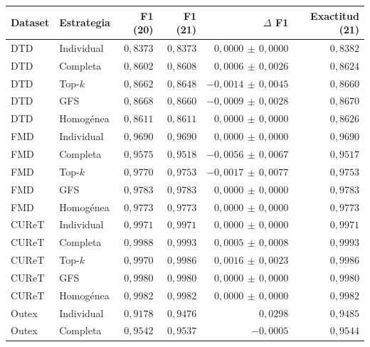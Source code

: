 \begin{resulttable}
\centering\fontsize{9}{11}\selectfont\setlength{\tabcolsep}{3.6pt}
\caption{Comparación completa con ResMLP: medias con 20 frente a 21 bloques, incluyendo RGB Pixel N-grams + SVD. Mismas 28 condiciones externas: DTD (10), FMD (15), CUReT (2) y Outex (1). La selección se repite dentro del entrenamiento.}
\label{tab:ngram-multibase}
\begin{tabular}{@{}llrrrr@{}}
\toprule
Dataset & Estrategia & F1 (20) & F1 (21) & $\Delta$ F1 & Exactitud (21) \\
\midrule
DTD & Individual & $0{,}8373$ & $0{,}8373$ & $0{,}0000\,\pm\,0{,}0000$ & $0{,}8382$ \\
DTD & Completa & $0{,}8602$ & $0{,}8608$ & $0{,}0006\,\pm\,0{,}0026$ & $0{,}8624$ \\
DTD & Top-$k$ & $0{,}8662$ & $0{,}8648$ & $-0{,}0014\,\pm\,0{,}0045$ & $0{,}8660$ \\
DTD & GFS & $0{,}8668$ & $0{,}8660$ & $-0{,}0009\,\pm\,0{,}0028$ & $0{,}8670$ \\
DTD & Homogénea & $0{,}8611$ & $0{,}8611$ & $0{,}0000\,\pm\,0{,}0000$ & $0{,}8626$ \\
FMD & Individual & $0{,}9690$ & $0{,}9690$ & $0{,}0000\,\pm\,0{,}0000$ & $0{,}9690$ \\
FMD & Completa & $0{,}9575$ & $0{,}9518$ & $-0{,}0056\,\pm\,0{,}0067$ & $0{,}9517$ \\
FMD & Top-$k$ & $0{,}9770$ & $0{,}9753$ & $-0{,}0017\,\pm\,0{,}0077$ & $0{,}9753$ \\
FMD & GFS & $0{,}9783$ & $0{,}9783$ & $0{,}0000\,\pm\,0{,}0000$ & $0{,}9783$ \\
FMD & Homogénea & $0{,}9773$ & $0{,}9773$ & $0{,}0000\,\pm\,0{,}0000$ & $0{,}9773$ \\
CUReT & Individual & $0{,}9971$ & $0{,}9971$ & $0{,}0000\,\pm\,0{,}0000$ & $0{,}9971$ \\
CUReT & Completa & $0{,}9988$ & $0{,}9993$ & $0{,}0005\,\pm\,0{,}0008$ & $0{,}9993$ \\
CUReT & Top-$k$ & $0{,}9970$ & $0{,}9986$ & $0{,}0016\,\pm\,0{,}0023$ & $0{,}9986$ \\
CUReT & GFS & $0{,}9980$ & $0{,}9980$ & $0{,}0000\,\pm\,0{,}0000$ & $0{,}9980$ \\
CUReT & Homogénea & $0{,}9982$ & $0{,}9982$ & $0{,}0000\,\pm\,0{,}0000$ & $0{,}9982$ \\
Outex & Individual & $0{,}9178$ & $0{,}9476$ & $0{,}0298$ & $0{,}9485$ \\
Outex & Completa & $0{,}9542$ & $0{,}9537$ & $-0{,}0005$ & $0{,}9544$ \\

\end{tabular}
\end{resulttable}
